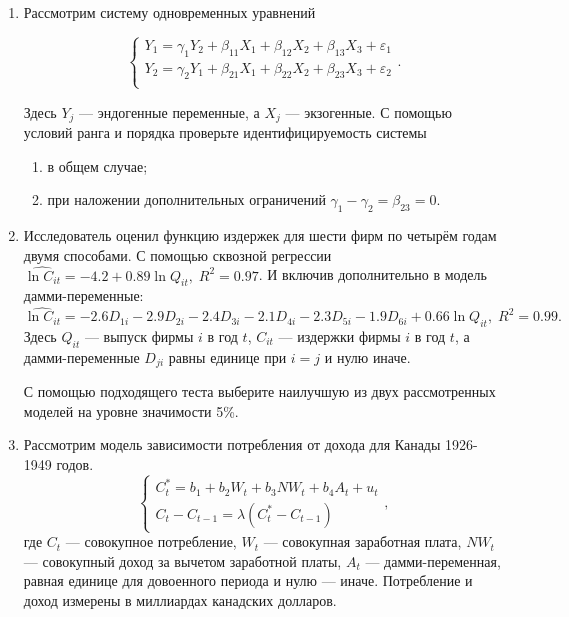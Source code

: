 \begin{enumerate}
\item Рассмотрим систему одновременных уравнений

\[
\begin{cases}
	Y_1 = \gamma_1 Y_2 + \beta_{11} X_{1} + \beta_{12} X_2 + \beta_{13} X_3  + \varepsilon_1 \\
	Y_2 = \gamma_2 Y_1 + \beta_{21} X_{1} + \beta_{22} X_2 + \beta_{23} X_3  + \varepsilon_2 \\
\end{cases}.
\]

Здесь $Y_j$ — эндогенные переменные, а $X_j$ — экзогенные. 
С помощью условий ранга и порядка проверьте идентифицируемость системы

\begin{enumerate}
	\item в общем случае;
	\item при наложении дополнительных ограничений $\gamma_1 - \gamma_2 = \beta_{23} = 0$.
\end{enumerate}

\item Исследователь оценил функцию издержек для шести фирм по четырём годам двумя способами.
С помощью сквозной регрессии 
$\widehat{\ln C_{it}} = -4.2 + 0.89 \ln Q_{it}, \; R^2 = 0.97$.
И включив дополнительно в модель дамми-переменные:
\[
\widehat{\ln C_{it}} =  -2.6D_{1i} -2.9D_{2i} - 2.4D_{3i} -2.1D_{4i}-2.3D_{5i}-1.9D_{6i} +  0.66 \ln Q_{it}, \; R^2 = 0.99.
\]
Здесь $Q_{it}$ — выпуск фирмы $i$ в год $t$, $C_{it}$ — издержки фирмы $i$ в год $t$, 
а дамми-переменные $D_{ji}$ равны единице при $i=j$ и нулю иначе.

С помощью подходящего теста выберите наилучшую из двух рассмотренных моделей на уровне значимости 5\%.

\item Рассмотрим модель зависимости потребления от дохода для Канады 1926-1949 годов. 
\[
\begin{cases}
	C_t^* = b_1 + b_2 W_t + b_3 NW_t + b_4 A_t + u_t \\
	C_t - C_{t-1} = \lambda (C_t^* - C_{t-1})
\end{cases},
\]
где $C_t$ — совокупное потребление, $W_t$ — совокупная заработная плата, $NW_t$ — совокупный доход за вычетом заработной платы,
$A_t$ — дамми-переменная, равная единице для довоенного периода и нулю — иначе. 
Потребление и доход измерены в миллиардах канадских долларов. 


\end{enumerate}
